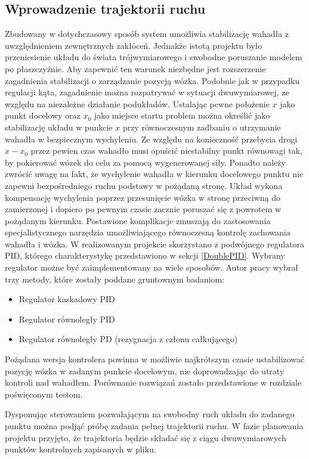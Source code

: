 \documentclass[12pt, oneside]{report}
\theoremstyle{definition}
\begin{document}
\subsection{Wprowadzenie trajektorii ruchu}
Zbudowany w dotychczasowy sposób system umożliwia stabilizację wahadła z uwzględnieniem zewnętrznych zakłóceń. Jednakże istotą projektu było przeniesienie układu do świata trójwymiarowego i swobodne poruszanie modelem po płaszczyźnie. Aby zapewnić ten warunek niezbędne jest rozszerzenie zagadnienia stabilizacji o zarządzanie pozycją wózka. Podobnie jak w przypadku regulacji kąta, zagadnienie można rozpatrywać w sytuacji dwuwymiarowej, ze względu na niezależne działanie podukładów. Ustalając pewne położenie $x$ jako punkt docelowy oraz $x_0$ jako miejsce startu problem można określić jako stabilizację układu w punkcie $x$ przy równoczesnym zadbaniu o utrzymanie wahadła w bezpiecznym wychyleniu. Ze względu na konieczność przebycia drogi $x - x_0$ przez pewien czas wahadło musi opuścić niestabilny punkt równowagi tak, by pokierować wózek do celu za pomocą wygenerowanej siły. Ponadto należy zwrócić uwagę na fakt, że wychylenie wahadła w kierunku docelowego punktu nie zapewni bezpośredniego ruchu podstawy w pożądaną stronę. Układ wykona kompensację wychylenia poprzez przesunięcie wózka w stronę przeciwną do zamierzonej i dopiero po pewnym czasie zacznie poruszać się z powrotem w pożądanym kierunku. Postawione komplikacje zmuszają do zastosowania specjalistycznego narzędzia umożliwiającego równoczesną kontrolę zachowania wahadła i wózka. W realizowanym projekcie skorzystano z podwójnego regulatora PID, którego charakterystykę przedstawiono w sekcji \ref{DoublePID}. Wybrany regulator możne być zaimplementowany na wiele sposobów. Autor pracy wybrał trzy metody, które zostały poddane gruntownym badaniom:
\begin{itemize}
\item Regulator kaskadowy PID
\item Regulator równoległy PID
\item Regulator równoległy PD (rezygnacja z członu całkującego)
\end{itemize}

Pożądana wersja kontrolera powinna w możliwie najkrótszym czasie ustabilizować pozycję wózka w zadanym punkcie docelowym, nie doprowadzając do utraty kontroli nad wahadłem. Porównanie rozwiązań zostało przedstawione w rozdziale poświęconym testom. 

Dysponując sterowaniem pozwalającym na swobodny ruch układu do zadanego punktu można podjąć próbę zadania pełnej trajektorii ruchu. W fazie planowania projektu przyjęto, że trajektoria będzie składać się z ciągu dwuwymiarowych punktów kontrolnych zapisanych w pliku.
\end{document}
